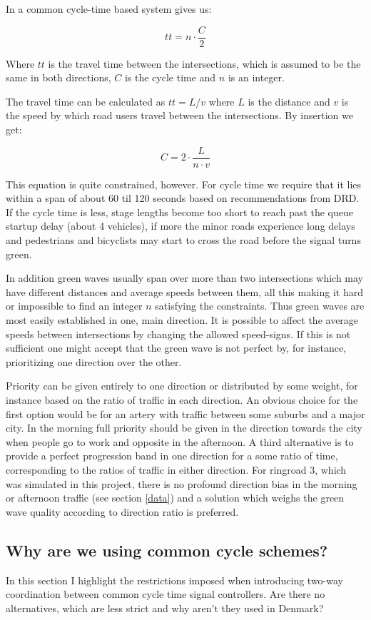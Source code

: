 In a common cycle-time based system \cite{coord} gives us:

$$tt = n \cdot \frac{C}{2}$$

Where $tt$ is the travel time between the intersections, which is assumed to be the same in both directions, $C$ is the cycle time and $n$ is an integer.

The travel time can be calculated as $tt = L / v$ where $L$ is the distance and $v$ is the speed by which road users travel between the intersections. By insertion we get:

$$C = 2 \cdot \frac{L}{n \cdot v}$$

This equation is quite constrained, however. For cycle time we require that it lies within a span of about 60 til 120 seconds based on recommendations from DRD. If the cycle time is less, stage lengths become too short to reach past the queue startup delay (about 4 vehicles), if more the minor roads experience long delays and pedestrians and bicyclists may start to cross the road before the signal turns green.

In addition green waves usually span over more than two intersections which may have different distances and average speeds between them, all this making it hard or impossible to find an integer $n$ satisfying the constraints. Thus green waves are most easily established in one, main direction. It is possible to affect the average speeds between intersections by changing the allowed speed-signs. If this is not sufficient one might accept that the green wave is not perfect by, for instance, prioritizing one direction over the other.

Priority can be given entirely to one direction or distributed by some weight, for instance based on the ratio of traffic in each direction. An obvious choice for the first option would be for an artery with traffic between some suburbs and a major city. In the morning full priority should be given in the direction towards the city when people go to work and opposite in the afternoon. A third alternative is to provide a perfect progression band in one direction for a some ratio of time, corresponding to the ratios of traffic in either direction.
For ringroad 3, which was simulated in this project, there is no profound direction bias in the morning or afternoon traffic (see section \ref{data}) and a solution which weighs the green wave quality according to direction ratio is preferred. 

\subsection*{Why are we using common cycle schemes?}
\label{phase_based}
In this section I highlight the restrictions imposed when introducing two-way coordination between common cycle time signal controllers. Are there no alternatives, which are less strict and why aren't they used in Denmark?

